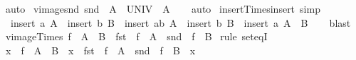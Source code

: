 \begin{isabellebody}
\endisadelimproof
%
\isatagproof
{}\isamarkupfalse%
\ auto%
\endisatagproof
{\isafoldproof}%
%
\isadelimproof
\isanewline
%
\endisadelimproof
\isanewline
{}\isamarkupfalse%
\ vimage{\isacharunderscore}{\kern0pt}snd{\isacharcolon}{\kern0pt}\ {\isachardoublequoteopen}snd\ {\isacharminus}{\kern0pt}{\isacharbackquote}{\kern0pt}\ A\ {\isacharequal}{\kern0pt}\ UNIV\ {\isasymtimes}\ A{\isachardoublequoteclose}\isanewline
%
\isadelimproof
\ \ %
\endisadelimproof
%
\isatagproof
{}\isamarkupfalse%
\ auto%
\endisatagproof
{\isafoldproof}%
%
\isadelimproof
\isanewline
%
\endisadelimproof
\isanewline
{}\isamarkupfalse%
\ insert{\isacharunderscore}{\kern0pt}Times{\isacharunderscore}{\kern0pt}insert\ {\isacharbrackleft}{\kern0pt}simp{\isacharbrackright}{\kern0pt}{\isacharcolon}{\kern0pt}\isanewline
\ \ {\isachardoublequoteopen}insert\ a\ A\ {\isasymtimes}\ insert\ b\ B\ {\isacharequal}{\kern0pt}\ insert\ {\isacharparenleft}{\kern0pt}a{\isacharcomma}{\kern0pt}b{\isacharparenright}{\kern0pt}\ {\isacharparenleft}{\kern0pt}A\ {\isasymtimes}\ insert\ b\ B\ {\isasymunion}\ insert\ a\ A\ {\isasymtimes}\ B{\isacharparenright}{\kern0pt}{\isachardoublequoteclose}\isanewline
%
\isadelimproof
\ \ %
\endisadelimproof
%
\isatagproof
{}\isamarkupfalse%
\ blast%
\endisatagproof
{\isafoldproof}%
%
\isadelimproof
\isanewline
%
\endisadelimproof
\isanewline
{}\isamarkupfalse%
\ vimage{\isacharunderscore}{\kern0pt}Times{\isacharcolon}{\kern0pt}\ {\isachardoublequoteopen}f\ {\isacharminus}{\kern0pt}{\isacharbackquote}{\kern0pt}\ {\isacharparenleft}{\kern0pt}A\ {\isasymtimes}\ B{\isacharparenright}{\kern0pt}\ {\isacharequal}{\kern0pt}\ {\isacharparenleft}{\kern0pt}fst\ {\isasymcirc}\ f{\isacharparenright}{\kern0pt}\ {\isacharminus}{\kern0pt}{\isacharbackquote}{\kern0pt}\ A\ {\isasyminter}\ {\isacharparenleft}{\kern0pt}snd\ {\isasymcirc}\ f{\isacharparenright}{\kern0pt}\ {\isacharminus}{\kern0pt}{\isacharbackquote}{\kern0pt}\ B{\isachardoublequoteclose}\isanewline
%
\isadelimproof
%
\endisadelimproof
%
\isatagproof
{}\isamarkupfalse%
\ {\isacharparenleft}{\kern0pt}rule\ set{\isacharunderscore}{\kern0pt}eqI{\isacharparenright}{\kern0pt}\isanewline
\ \ \isamarkupfalse%
\ {\isachardoublequoteopen}x\ {\isasymin}\ f\ {\isacharminus}{\kern0pt}{\isacharbackquote}{\kern0pt}\ {\isacharparenleft}{\kern0pt}A\ {\isasymtimes}\ B{\isacharparenright}{\kern0pt}\ {\isasymlongleftrightarrow}\ x\ {\isasymin}\ {\isacharparenleft}{\kern0pt}fst\ {\isasymcirc}\ f{\isacharparenright}{\kern0pt}\ {\isacharminus}{\kern0pt}{\isacharbackquote}{\kern0pt}\ A\ {\isasyminter}\ {\isacharparenleft}{\kern0pt}snd\ {\isasymcirc}\ f{\isacharparenright}{\kern0pt}\ {\isacharminus}{\kern0pt}{\isacharbackquote}{\kern0pt}\ B{\isachardoublequoteclose}\ \ x\isanewline

\end{isabellebody}
